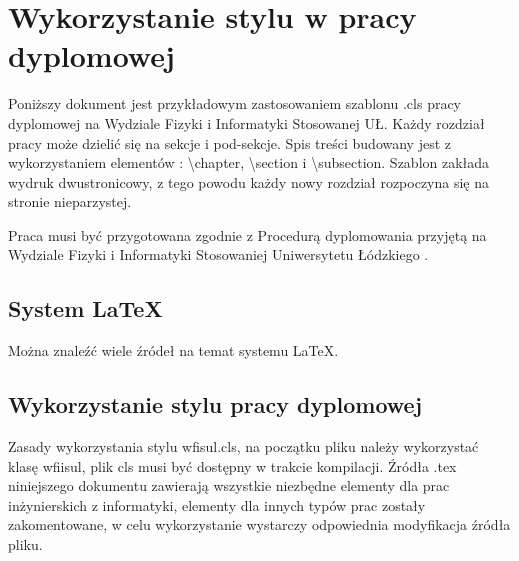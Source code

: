 \documentclass{wfiisul}
\begin{document}

\nralbumu{****}

\promotor{***}
\katedra{****}


\specjalizacja{****}






\stronatytulowa


\chapter{Wykorzystanie stylu w pracy dyplomowej}

Poniższy dokument jest przykładowym zastosowaniem szablonu .cls pracy dyplomowej na Wydziale Fizyki i Informatyki Stosowanej UŁ. Każdy rozdział pracy może dzielić się na sekcje i pod-sekcje. Spis treści budowany jest z wykorzystaniem elementów : {\textbackslash}chapter, {\textbackslash}section i {\textbackslash}subsection. Szablon zakłada wydruk dwustronicowy, z tego powodu każdy nowy rozdział rozpoczyna się na stronie nieparzystej.

Praca musi być przygotowana zgodnie z Procedurą dyplomowania przyjętą na Wydziale Fizyki i Informatyki Stosowaniej Uniwersytetu Łódzkiego \cite{Procedura_dyplomowania}.
\section{System \LaTeX}
Można znaleźć wiele źródeł na temat systemu \LaTeX \cite{latex_wiki}.

\section{Wykorzystanie stylu pracy dyplomowej}
Zasady wykorzystania stylu wfisul.cls, na początku pliku należy wykorzystać klasę wfiisul, plik cls musi być dostępny w trakcie kompilacji. Źródła .tex niniejszego dokumentu zawierają wszystkie niezbędne elementy dla prac inżynierskich z informatyki, elementy dla innych typów prac zostały zakomentowane, w celu wykorzystanie wystarczy odpowiednia modyfikacja źródła pliku. 
\end{document}
